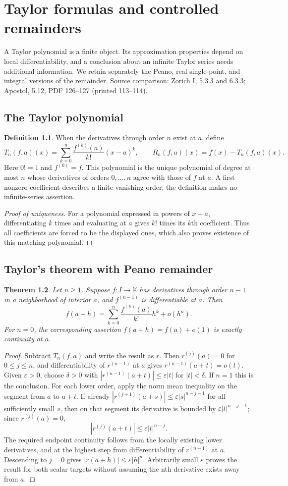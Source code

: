 \documentclass[11pt,oneside,a4paper]{book}
\newtheorem{theorem}{Theorem}[chapter]
\theoremstyle{definition}
\newtheorem{definition}[theorem]{Definition}
\theoremstyle{remark}
\newcommand{\K}{\mathbb K}
\newcommand{\eps}{\varepsilon}
\newcommand{\KEntry}[2]{\Needspace{7\baselineskip}\section{#2}\label{#1}{\small\sffamily\color{black!60}\detokenize{#1}}\par}
\newcommand{\SourceRef}[1]{{\small\textsf{Source comparison: #1.}}}
\begin{document}


\chapter{Taylor formulas and controlled remainders}
A Taylor polynomial is a finite object. Its approximation properties depend on local differentiability, and a conclusion about an infinite Taylor series needs additional information. We retain separately the Peano, real single-point, and integral versions of the remainder.
\SourceRef{Zorich I, 5.3.3 and 6.3.3; Apostol, 5.12, PDF 126--127 (printed 113--114)}

\KEntry{K03.06.taylor_polynomial}{The Taylor polynomial}
\begin{definition}
When the derivatives through order $n$ exist at $a$, define
\[ T_n(f,a)(x)=\sum_{k=0}^n\frac{f^{(k)}(a)}{k!}(x-a)^k,\qquad R_n(f,a)(x)=f(x)-T_n(f,a)(x). \]
Here $0!=1$ and $f^{(0)}=f$. This polynomial is the unique polynomial of degree at most $n$ whose derivatives of orders $0,\ldots,n$ agree with those of $f$ at $a$. A first nonzero coefficient describes a finite vanishing order; the definition makes no infinite-series assertion.
\end{definition}
\begin{proof}[Proof of uniqueness]
For a polynomial expressed in powers of $x-a$, differentiating $k$ times and evaluating at $a$ gives $k!$ times its $k$th coefficient. Thus all coefficients are forced to be the displayed ones, which also proves existence of this matching polynomial.
\end{proof}

\KEntry{K03.06.peano}{Taylor's theorem with Peano remainder}
\begin{theorem}
Let $n\ge1$. Suppose $f:I\to\K$ has derivatives through order $n-1$ in a neighborhood of interior $a$, and $f^{(n-1)}$ is differentiable at $a$. Then
\[ f(a+h)=\sum_{k=0}^n\frac{f^{(k)}(a)}{k!}h^k+o(h^n). \]
For $n=0$, the corresponding assertion $f(a+h)=f(a)+o(1)$ is exactly continuity at $a$.
\end{theorem}
\begin{proof}
Subtract $T_n(f,a)$ and write the result as $r$. Then $r^{(j)}(a)=0$ for $0\le j\le n$, and differentiability of $r^{(n-1)}$ at $a$ gives $r^{(n-1)}(a+t)=o(t)$. Given $\eps>0$, choose $\delta>0$ with $|r^{(n-1)}(a+t)|\le\eps|t|$ for $|t|<\delta$. If $n=1$ this is the conclusion. For each lower order, apply the norm mean inequality on the segment from $a$ to $a+t$. If already $|r^{(j+1)}(a+s)|\le\eps|s|^{n-j-1}$ for all sufficiently small $s$, then on that segment its derivative is bounded by $\eps|t|^{n-j-1}$; since $r^{(j)}(a)=0$,
\[ |r^{(j)}(a+t)|\le\eps|t|^{n-j}. \]
The required endpoint continuity follows from the locally existing lower derivatives, and at the highest step from differentiability of $r^{(n-1)}$ at $a$. Descending to $j=0$ gives $|r(a+h)|\le\eps|h|^n$. Arbitrarily small $\eps$ proves the result for both scalar targets without assuming the nth derivative exists away from $a$.
\end{proof}
\end{document}
